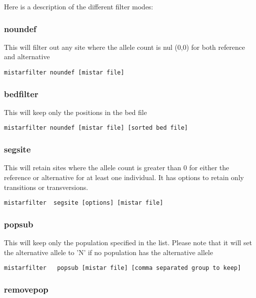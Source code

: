 \documentclass[a4paper]{article}
\begin{document}
Here is a description of the different filter modes:

\subsubsection{noundef}

This will filter out any site where the allele count is nul (0,0) for both reference and alternative

\begin{verbatim}
mistarfilter noundef [mistar file]
\end{verbatim}


\subsubsection{bedfilter}

This will keep only the positions in the bed file

\begin{verbatim}
mistarfilter noundef [mistar file] [sorted bed file]
\end{verbatim}

\subsubsection{segsite}

This will retain sites where the allele count is greater than 0 for either the reference or alternative for at least one individual. It has options to retain only transitions or transversions. 

\begin{verbatim}
mistarfilter  segsite [options] [mistar file]
\end{verbatim}

\subsubsection{popsub}

This will keep only the population specified in the list. Please note that it will set the alternative allele to 'N' if no population has the alternative allele

\begin{verbatim}
mistarfilter   popsub [mistar file] [comma separated group to keep]
\end{verbatim}

\subsubsection{removepop}
\end{document}
